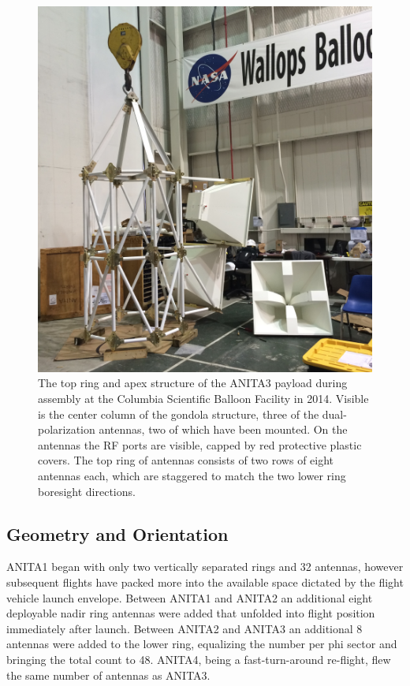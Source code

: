 \begin{figure}
\centering
	\includegraphics[width=\textwidth]{figures/AntennaAssembly}
	\caption{The top ring and apex structure of the ANITA3 payload during assembly at the Columbia Scientific Balloon Facility in 2014.  Visible is the center column of the gondola structure, three of the dual-polarization antennas, two of which have been mounted.  On the antennas the RF ports are visible, capped by red protective plastic covers.  The top ring of antennas consists of two rows of eight antennas each, which are staggered to match the two lower ring boresight directions.}
	\label{fig:antennaAssembly}
\end{figure}	
	
\subsection{Geometry and Orientation}
	ANITA1 began with only two vertically separated rings and 32 antennas, however subsequent flights have packed more into the available space dictated by the flight vehicle launch envelope.  Between ANITA1 and ANITA2 an additional eight deployable nadir ring antennas were added that unfolded into flight position immediately after launch.  Between ANITA2 and ANITA3 an additional 8 antennas were added to the lower ring, equalizing the number per phi sector and bringing the total count to 48.  ANITA4, being a fast-turn-around re-flight, flew the same number of antennas as ANITA3.  
	
